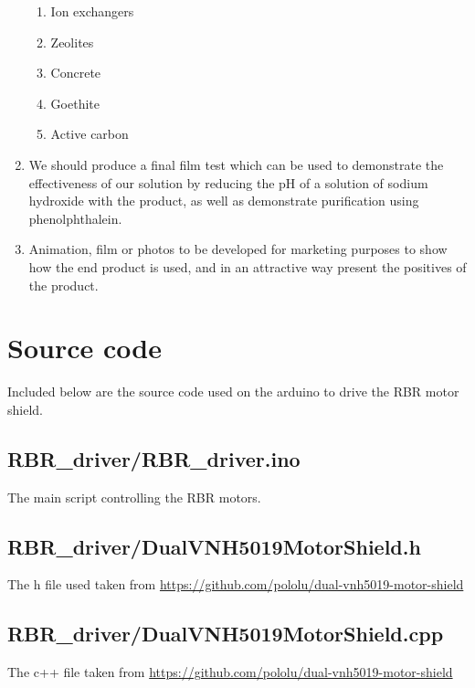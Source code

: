 \begin{enumerate}
    \begin{enumerate}
        \item Ion exchangers
        \item Zeolites
        \item Concrete
        \item Goethite
        \item Active carbon
    \end{enumerate}
    \item We should produce a final film test which can be used to demonstrate the effectiveness of our solution by reducing the pH of a solution of sodium hydroxide with the product, as well as demonstrate purification using phenolphthalein.
    \item Animation, film or photos to be developed for marketing purposes to show how the end product is used, and in an attractive way present the positives of the product.
\end{enumerate}

\newpage
    \section{Source code}
    Included below are the source code used on the arduino to drive the RBR motor shield.

\subsection{RBR\_driver/RBR\_driver.ino}
The main script controlling the RBR motors.

\subsection{RBR\_driver/DualVNH5019MotorShield.h}
The h file used taken from \url{https://github.com/pololu/dual-vnh5019-motor-shield}  
\subsection{RBR\_driver/DualVNH5019MotorShield.cpp}
The c++ file taken from \url{https://github.com/pololu/dual-vnh5019-motor-shield}





